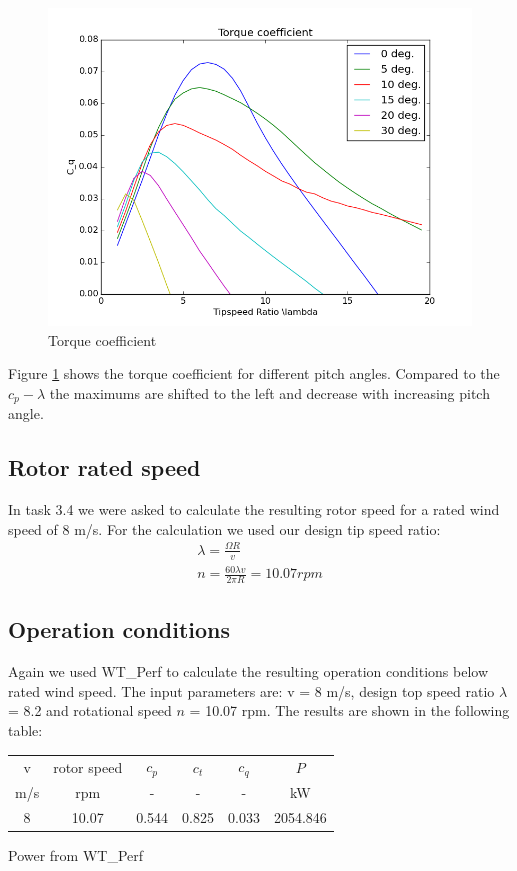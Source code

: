 \documentclass[10pt]{article}
\begin{document}
\begin{figure}[H]
\centering
\includegraphics[width=1\linewidth]{../CIP_3/WT_Perf/Output/torque.png}
\caption{Torque coefficient}
\label{fig:torque-coeff}
\end{figure} 
Figure \ref{fig:torque-coeff} shows the torque coefficient for different pitch angles. Compared to the $c_p-\lambda$ the maximums are shifted to the left and decrease with increasing pitch angle.  
\subsection{Rotor rated speed}
In task 3.4 we were asked to calculate the resulting rotor speed for a rated wind speed of 8 m/s. For the calculation we used our design tip speed ratio:
\begin{align}
\lambda = \frac{\Omega R}{v}\\
n = \frac{60 \lambda v}{2 \pi R} = 10.07 rpm
\end{align}
\subsection{Operation conditions}
Again we used WT\_Perf to calculate the resulting operation conditions below rated wind speed. The input parameters are: v = 8 m/s, design top speed ratio $\lambda$ = 8.2 and rotational speed $n$ = 10.07 rpm. The results are shown in the following table:\\

\begin{tabular}{|c |c| c| c| c| c|}
\hline
v & rotor speed & $c_p$ & $c_t$ & $c_q$ & $P$\\
m/s &rpm & - &- &-& kW\\
\hline
8 &10.07&0.544&0.825&0.033& 2054.846\\
\hline
\end{tabular}
Power from WT\_Perf
\end{document}

